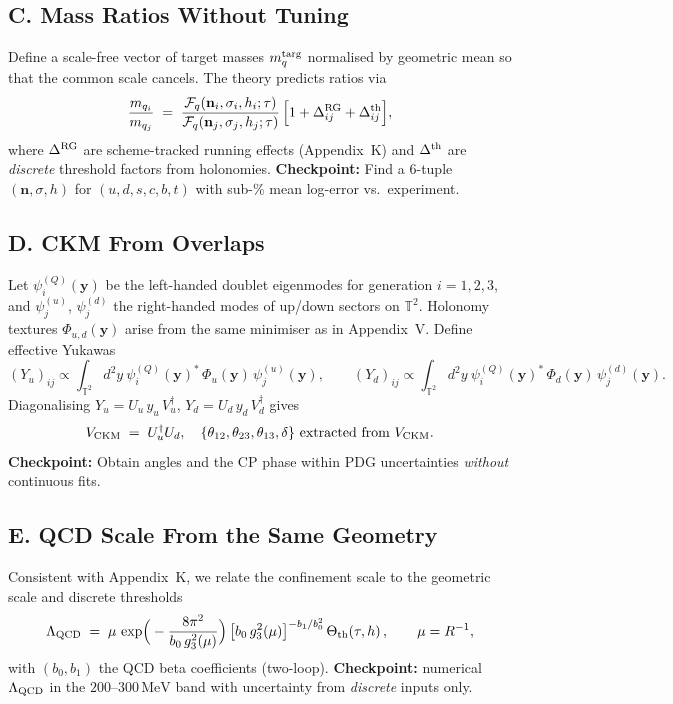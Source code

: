 \subsection*{C. Mass Ratios Without Tuning}
Define a scale-free vector of target masses $m_q^{\rm targ}$ normalised by geometric mean
so that the common scale cancels. The theory predicts ratios via
\begin{equation}
  \frac{m_{q_i}}{m_{q_j}} \;=\; 
  \frac{\mathcal F_q(\mathbf n_i,\sigma_i,h_i;\tau)}{\mathcal F_q(\mathbf n_j,\sigma_j,h_j;\tau)}\,
  \Big[1+\Delta^{\rm RG}_{ij}+\Delta^{\rm th}_{ij}\Big],
  \label{eq:QA:ratios}
\end{equation}
where $\Delta^{\rm RG}$ are scheme-tracked running effects (Appendix~K) and $\Delta^{\rm th}$ are
\emph{discrete} threshold factors from holonomies. \textbf{Checkpoint:} Find a 6-tuple
$(\mathbf n,\sigma,h)$ for $(u,d,s,c,b,t)$ with sub-\% mean log-error vs.\ experiment.

\subsection*{D. CKM From Overlaps}
Let $\psi^{(Q)}_i(\mathbf y)$ be the left-handed doublet eigenmodes for generation $i=1,2,3$,
and $\psi^{(u)}_j$, $\psi^{(d)}_j$ the right-handed modes of up/down sectors on $\mathbb{T}^2$.
Holonomy textures $\Phi_{u,d}(\mathbf y)$ arise from the same minimiser as in Appendix~V.
Define effective Yukawas
\begin{equation}
  (Y_u)_{ij} \propto \int_{\mathbb{T}^2}\! d^2y\ \psi^{(Q)}_i(\mathbf y)^\ast\,\Phi_u(\mathbf y)\,\psi^{(u)}_j(\mathbf y),\qquad
  (Y_d)_{ij} \propto \int_{\mathbb{T}^2}\! d^2y\ \psi^{(Q)}_i(\mathbf y)^\ast\,\Phi_d(\mathbf y)\,\psi^{(d)}_j(\mathbf y).
\end{equation}
Diagonalising $Y_u=U_u\,y_u\,V_u^\dagger$, $Y_d=U_d\,y_d\,V_d^\dagger$ gives
\begin{equation}
  V_{\rm CKM} \;=\; U_u^\dagger U_d,\quad
  \{\theta_{12},\theta_{23},\theta_{13},\delta\}\ \text{extracted from}\ V_{\rm CKM}.
\end{equation}
\textbf{Checkpoint:} Obtain angles and the CP phase within PDG uncertainties \emph{without} continuous fits.

\subsection*{E. QCD Scale From the Same Geometry}
Consistent with Appendix~K, we relate the confinement scale to the geometric scale and discrete thresholds
\begin{equation}
  \Lambda_{\mathrm{QCD}} \;=\; \mu\,\exp\!\Big(-\frac{8\pi^2}{b_0\,g_3^2(\mu)}\Big)\,\big[b_0\,g_3^2(\mu)\big]^{-b_1/b_0^2}\,
  \Theta_{\rm th}(\tau,h)\,,\qquad \mu=R^{-1},
\end{equation}
with $(b_0,b_1)$ the QCD beta coefficients (two-loop). \textbf{Checkpoint:} numerical $\Lambda_{\rm QCD}$ in the
$200\text{--}300\,\mathrm{MeV}$ band with uncertainty from \emph{discrete} inputs only.

